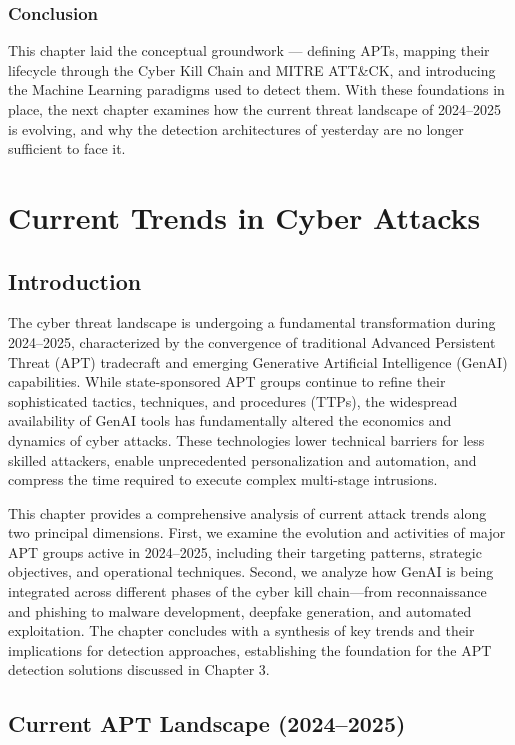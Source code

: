\subsection{Conclusion}
This chapter laid the conceptual groundwork — defining APTs, mapping their lifecycle
through the Cyber Kill Chain and MITRE ATT\&CK, and introducing the Machine Learning
paradigms used to detect them. With these foundations in place, the next chapter examines
how the current threat landscape of 2024--2025 is evolving, and why the detection
architectures of yesterday are no longer sufficient to face it.

\clearpage

\chapter{Current Trends in Cyber Attacks}

\section{Introduction}

The cyber threat landscape is undergoing a fundamental transformation during 2024--2025, characterized by the convergence of traditional Advanced Persistent Threat (APT) tradecraft and emerging Generative Artificial Intelligence (GenAI) capabilities. While state-sponsored APT groups continue to refine their sophisticated tactics, techniques, and procedures (TTPs), the widespread availability of GenAI tools has fundamentally altered the economics and dynamics of cyber attacks. These technologies lower technical barriers for less skilled attackers, enable unprecedented personalization and automation, and compress the time required to execute complex multi-stage intrusions.

This chapter provides a comprehensive analysis of current attack trends along two principal dimensions. First, we examine the evolution and activities of major APT groups active in 2024--2025, including their targeting patterns, strategic objectives, and operational techniques. Second, we analyze how GenAI is being integrated across different phases of the cyber kill chain---from reconnaissance and phishing to malware development, deepfake generation, and automated exploitation. The chapter concludes with a synthesis of key trends and their implications for detection approaches, establishing the foundation for the APT detection solutions discussed in Chapter 3.

\section{Current APT Landscape (2024--2025)}

